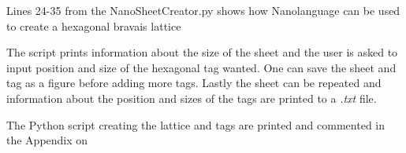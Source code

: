 \begin{listing}
 \inputminted[python3=true,bgcolor=Black,linenos=true,firstline=24,lastline=35]{python}{VNL/PythonScripts/NanoSheetCreator.py}
 \caption{Lines 24-35 from the NanoSheetCreator.py shows how Nanolanguage can be used to create a hexagonal bravais lattice}
 \label{2435}
\end{listing}
\twocolumngrid
The script prints information about the size of the sheet and the user is asked to input position and size of the hexagonal tag wanted. One can save the sheet and tag as a figure before adding more tags. Lastly the sheet can be repeated and information about the position and sizes of the tags are printed to a \textit{.txt} file.

The Python script creating the lattice and tags are printed and commented in the Appendix on 
